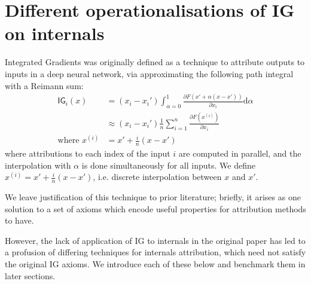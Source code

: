 \documentclass{article}
\makeatletter
\theoremstyle{plain}
\theoremstyle{definition}
\theoremstyle{remark}
\newcommand{\icml@realaddcontentsline}[3]{%
  \addtocontents{#1}{\protect\contentsline{#2}{#3}{\thepage}{\@currentHref} }%
}
\makeatother
\begin{document}
\makeatletter
\let\addcontentsline\icml@realaddcontentsline
\makeatother

\renewcommand{\contentsname}{Appendix}
\setcounter{tocdepth}{2}
\tableofcontents
\clearpage

\section{Different operationalisations of IG on internals}
\label{sec:ig-variants}

Integrated Gradients \citep{sundararajan2017axiomatic} was originally defined as a technique to attribute outputs to inputs in a deep neural network, via approximating the following path integral with a Reimann sum:
\begin{align}
\mathsf{IG}_i(x) &= (x_i - x_i') \int_{\alpha=0}^1\frac{\partial F(x' + \alpha(x - x'))}{\partial x_i} \mathrm{d}\alpha \\
&\approx (x_i - x_i')\frac{1}{n}\sum_{i=1}^n\frac{\partial F(x^{(i)})}{\partial x_i}\\
\text{where } x^{(i)} &= x' + \frac{i}{n}(x - x')
\end{align}
where attributions to each index of the input $i$ are computed in parallel, and the interpolation with $\alpha$ is done simultaneously for all inputs. We define $x^{(i)} = x' + \frac{i}{n}(x - x')$, i.e. discrete interpolation between $x$ and $x'$.

We leave justification of this technique to prior literature; briefly, it arises as one solution to a set of axioms which encode useful properties for attribution methods to have.

However, the lack of application of IG to internals in the original paper has led to a profusion of differing techniques for internals attribution, which need not satisfy the original IG axioms. We introduce each of these below and benchmark them in later sections.
\end{document}
